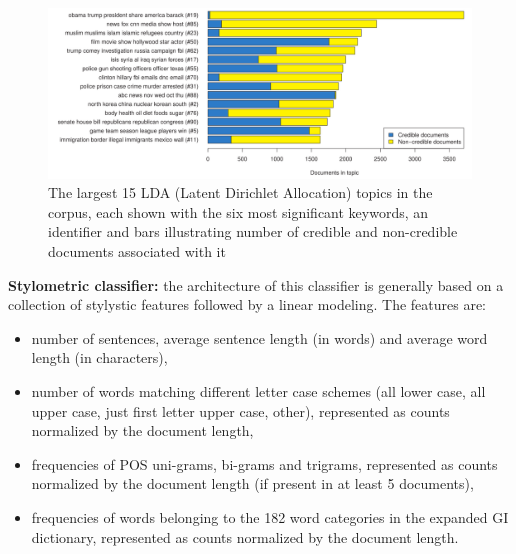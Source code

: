 \documentclass[10pt, english]{report}
\begin{document}
\begin{figure}[H]
	\centering
	\includegraphics[scale=0.4]{img/documents_in_topic.png}
	\caption{The largest 15 LDA (Latent Dirichlet Allocation) topics in the corpus, each shown with the six most signiﬁcant keywords, an identiﬁer and bars illustrating number of credible and non-credible documents associated with it \cite{przybyla2020capturing}}
\end{figure}

\textbf{Stylometric classifier:} the architecture of this classifier is generally based on a collection of stylystic features followed by a linear modeling. The features are: 
	\begin{itemize}
	\item number of sentences, average sentence length (in words) and average word length (in characters),
	\item number of words matching different letter case schemes (all lower case, all upper case, just first letter upper case, other), represented as counts normalized by the document length,
	\item frequencies of POS uni-grams, bi-grams and trigrams, represented as counts normalized by the document length (if present in at least 5 documents),
	\item frequencies of words belonging to the 182 word categories in the expanded GI dictionary, represented as counts normalized by the document length.
	\end{itemize}
\end{document}
